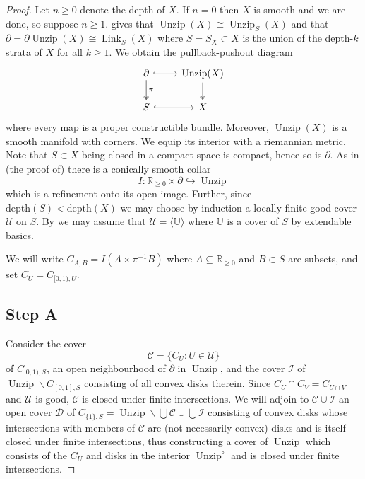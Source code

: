 \documentclass[11pt]{amsart}
\newcommand{\mcal}[1]{\mathcal{#1}}
\newcommand{\mrm}[1]{\mathrm{#1}}
\newcommand{\mbb}[1]{\mathbb{#1}}
\newcommand{\R}{\mbb{R}}
\DeclareMathOperator{\Unzip}{Unzip}
\DeclareMathOperator{\Link}{Link}
\numberwithin{equation}{section}
\theoremstyle{definition}
\theoremstyle{remark}
\theoremstyle{plain}
\begin{document}
\begin{proof}
    Let $n\geq0$ denote the depth of $X$. If $n=0$ then $X$ is smooth and we are done, so suppose $n\geq1$.  gives that $\Unzip(X)\cong\Unzip_{S}(X)$ and that $\partial=\partial\Unzip(X)\cong\Link_S(X)$ where $S=S_X\subset X$ is the union of the depth-$k$ strata of $X$ for all $k\geq1$. We obtain the pullback-pushout diagram 
    \[
    \begin{tikzcd}
        \partial\ar[r,hook]\ar[d,two heads,"{\pi}"] & \Unzip(X)\ar[d,two heads]\\
        S\ar[r,hook] & X
    \end{tikzcd}
    \] 
    where every map is a proper constructible bundle. Moreover, $\Unzip(X)$ is a smooth manifold with corners. We equip its interior with a riemannian metric. Note that $S\subset X$ being closed in a compact space is compact, hence so is $\partial$.
    As in (the proof of) \cite[Proposition 8.2.5]{ayala2017local} there is a conically smooth collar 
    \[
        I\colon \R_{\geq0}\times\partial\hookrightarrow \Unzip
    \]
    which is a refinement onto its open image. Further, since $\mrm{depth}(S)<\mrm{depth}(X)$ we may choose by induction a locally finite good cover $\mcal{U}$ on $S$. By  we may assume that $\mcal{U}=\langle\mbb{U}\rangle$ where $\mbb{U}$ is a cover of $S$ by extendable basics.

    We will write 
    \(
        C_{A,B}=I(A\times\pi^{-1}B)
    \)
    where $A\subseteq \R_{\geq0}$ and $B\subset S$ are subsets, and set 
    \(
        C_U=C_{[0,1),U}.
    \)

    \subsection*{Step A}
    Consider the cover 
    \[
        \mcal{C}=\{C_U : U\in\mcal{U}\}
    \]
    of $C_{[0,1),S}$, an open neighbourhood of $\partial$ in $\Unzip$, and the cover $\mcal{I}$ of $\Unzip\smallsetminus C_{[0,1],S}$ consisting of all convex disks therein. Since $C_{U}\cap C_{V}=C_{U\cap V}$ and $\mcal{U}$ is good, $\mcal{C}$ is closed under finite intersections. We will adjoin to $\mcal{C}\cup\mcal{I}$ an open cover $\mcal{D}$ of $C_{\{1\},S}=\Unzip\smallsetminus \bigcup\mcal{C}\cup\bigcup\mcal{I}$ consisting of convex disks whose intersections with members of $\mcal{C}$ are (not necessarily convex) disks and is itself closed under finite intersections, thus constructing a cover of $\Unzip$ which consists of the $C_U$ and disks in the interior $\Unzip^\circ$ and is closed under finite intersections. 


\end{proof}
\end{document}
